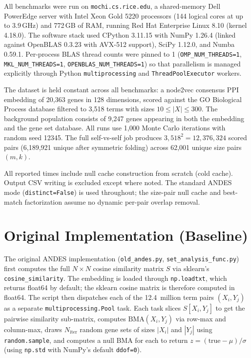 \documentclass[11pt,a4paper]{article}
\begin{document}
All benchmarks were run on \texttt{mochi.cs.rice.edu}, a shared-memory Dell
PowerEdge server with Intel Xeon Gold 5220 processors (144 logical cores at
up to 3.9\,GHz) and 772\,GB of RAM, running Red Hat Enterprise Linux 8.10
(kernel 4.18.0). The software stack used CPython 3.11.15 with NumPy 1.26.4
(linked against OpenBLAS 0.3.23 with AVX-512 support), SciPy 1.12.0, and
Numba 0.59.1. Per-process BLAS thread counts were pinned to 1
(\texttt{OMP\_NUM\_THREADS=1}, \texttt{MKL\_NUM\_THREADS=1},
\texttt{OPENBLAS\_NUM\_THREADS=1}) so that parallelism is managed explicitly
through Python \texttt{multiprocessing} and \texttt{ThreadPoolExecutor}
workers.

The dataset is held constant across all benchmarks: a node2vec consensus PPI
embedding of 20{,}363 genes in 128 dimensions, scored against the GO
Biological Process database filtered to 3{,}518 terms with sizes
$10 \le |X| \le 300$. The background population consists of 9{,}247 genes
appearing in both the embedding and the gene set database. All runs use
	1{,}000 Monte Carlo iterations with random seed 12345. The full self-vs-self
job produces $3{,}518^2 = 12{,}376{,}324$ scored pairs (6{,}189{,}921 unique
after symmetric folding) across 62{,}001 unique size pairs $(m,k)$.

All reported times include null cache construction from scratch (cold cache).
Output CSV writing is excluded except where noted. The standard ANDES mode
(\texttt{distinct=False}) is used throughout; the size-pair null cache and
best-match factorization assume no dynamic per-pair overlap removal.

\section{Original Implementation (Baseline)}
\label{sec:baseline}

The original ANDES implementation (\texttt{old\_andes.py},
\texttt{set\_analysis\_func.py}) first computes the full $N \times N$ cosine
similarity matrix $S$ via sklearn's \texttt{cosine\_similarity}. The
embedding is loaded through \texttt{np.loadtxt}, which returns float64 by
default; the sklearn cosine matrix is therefore computed in float64. The
script then dispatches each of the 12.4~million term pairs $(X_i, Y_j)$ as
a separate \texttt{multiprocessing.Pool} task. Each task slices $S[X_i,Y_j]$
to get the pairwise similarity sub-matrix, computes
$\mathrm{BMA}(X_i, Y_j)$ via row-max and column-max, draws $N_\text{iter}$
random gene sets of sizes $|X_i|$ and $|Y_j|$ using \texttt{random.sample},
and computes a null BMA for each to return $z = (\text{true} - \mu) / \sigma$
(using \texttt{np.std} with NumPy's default \texttt{ddof=0}).
\end{document}
